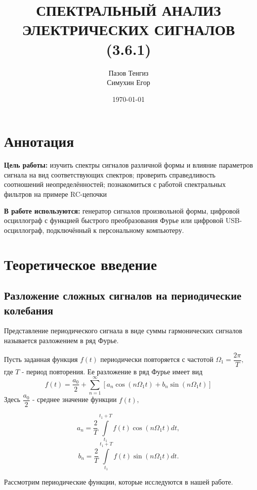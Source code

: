 \documentclass[a4paper,12pt]{article}
\title{СПЕКТРАЛЬНЫЙ АНАЛИЗ ЭЛЕКТРИЧЕСКИХ СИГНАЛОВ (3.6.1)}
\author{Пазов Тенгиз\\
Симухин Егор}
\date{\today}
\theoremstyle{definition}
\begin{document}
\maketitle
\section{Аннотация}
\indent
\indent \textbf{Цель работы:} изучить спектры сигналов различной формы и влияние параметров сигнала
на вид соответствующих спектров; проверить справедливость соотношений неопределённостей; познакомиться с работой спектральных фильтров на примере RC-цепочки

\indent \textbf{В работе используются:} генератор сигналов произвольной формы, цифровой осциллограф с функцией быстрого преобразования Фурье или цифровой USB-осциллограф, подключённый к персональному компьютеру.

\section{Теоретическое введение}

\subsection*{Разложение сложных сигналов на периодические колебания}
Представление периодического сигнала в виде суммы гармонических сигналов называется разложением в ряд Фурье.

Пусть заданная функция $f(t)$ периодически повторяется с частотой $\Omega_{1}=\dfrac{2\pi}{T},$ где $T$ - период повторения. Ее разложение в ряд Фурье имеет вид
\begin{equation}
f(t)=\dfrac{a_{0}}{2}+ \sum\limits_{n=1}^\infty [a_{n}\cos(n \Omega_{1}t)+b_{n}\sin(n \Omega_{1} t) ]
\label{eq1}
\end{equation}
Здесь $\dfrac{a_{0}}{2}$ - среднее значение функции $f(t)$,

\begin{equation}
a_{n}=\dfrac{2}{T}\int\limits_{t_{1}}^{t_{1}+T}f(t)\cos(n \Omega_{1} t)dt,
\label{eq2}
\end{equation}
\begin{equation}
b_{n}=\dfrac{2}{T}\int\limits_{t_{1}}^{t_{1}+T}f(t)\sin(n \Omega_{1} t)dt.
\label{eq3}
\end{equation}

Рассмотрим периодические функции, которые исследуются в нашей
работе.
\end{document}
